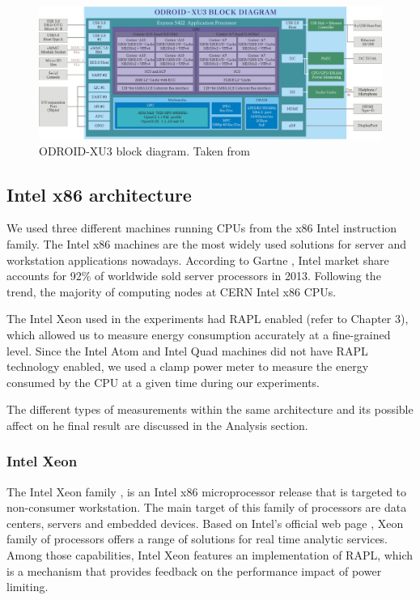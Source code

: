 \begin{figure}[h!]
  \centering
    \includegraphics[width=\textwidth]{"img/odroidxu3-diagram"}
    \caption{ODROID-XU3 block diagram. Taken from \cite{ODROID_XU3}}
    \label{fig:odroidxu3-diagram}
\end{figure}


\subsection{Intel x86 architecture}

We used three different machines running CPUs from the x86 Intel instruction family. The Intel x86 machines are the most widely
used solutions for server and workstation applications nowadays. According to Gartne \cite{INTEL_DOMINANCE}, Intel market share accounts for 92\% of worldwide sold server processors in 2013. Following the trend, the majority of computing nodes at CERN Intel x86 CPUs.


The Intel Xeon used in the experiments had RAPL enabled (refer to Chapter 3), which allowed us to measure energy
consumption accurately at a fine-grained level. Since the Intel Atom and Intel Quad machines
did not have RAPL technology enabled, we used a clamp power meter to measure the
energy consumed by the CPU at a given time during our experiments.

The different types of measurements within the same architecture and
its possible affect on he final result are discussed in the Analysis section.

\subsubsection*{Intel Xeon}

The Intel Xeon family \cite{xeon_intro}, is an Intel x86 microprocessor release that is targeted to non-consumer workstation. The main target of this family of processors are data centers, servers and embedded devices. Based on Intel's official web page \cite{xeon_intro}, Xeon family of processors offers a range of solutions for real time analytic services. Among those capabilities, Intel Xeon features an implementation of RAPL, which is a mechanism that provides feedback on the performance impact of power limiting.

